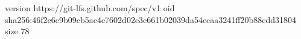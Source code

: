 version https://git-lfs.github.com/spec/v1
oid sha256:46f2c6e9b09cb5ac4e7602d02e3c661b02039da54ecaa3241ff20b88cdd31804
size 78
